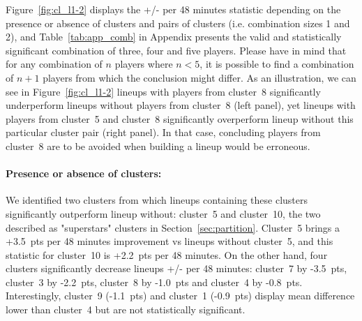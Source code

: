 Figure~\ref{fig:cl_l1-2} displays the +/- per 48 minutes statistic depending on the presence or absence of clusters and pairs of clusters (i.e. combination sizes 1 and 2), and Table~\ref{tab:app_comb} in Appendix presents the valid and statistically significant combination of three, four and five players.
Please have in mind that for any combination of $n$ players where $n < 5$, it is possible to find a combination of $n+1$ players from which the conclusion might differ.
As an illustration, we can see in Figure~\ref{fig:cl_l1-2} lineups with players from cluster~8 significantly underperform lineups without players from cluster~8 (left panel), yet lineups with players from cluster~5 and cluster~8 significantly overperform lineup without this particular cluster pair (right panel).
In that case, concluding players from cluster~8 are to be avoided when building a lineup would be erroneous.  

\paragraph{Presence or absence of clusters:}
We identified two clusters from which lineups containing these clusters significantly outperform lineup without: cluster~5 and cluster~10, the two described as "superstars" clusters in Section~\ref{sec:partition}.
Cluster~5 brings a +3.5~pts per 48 minutes improvement vs lineups without cluster~5, and this statistic for cluster~10 is +2.2~pts per 48 minutes. 
On the other hand, four clusters significantly decrease lineups +/- per 48 minutes: cluster~7 by -3.5~pts, cluster~3 by -2.2~pts, cluster~8 by -1.0~pts and cluster~4 by -0.8~pts.
Interestingly, cluster~9 (-1.1~pts) and cluster~1 (-0.9~pts) display mean difference lower than cluster~4 but are not statistically significant.

